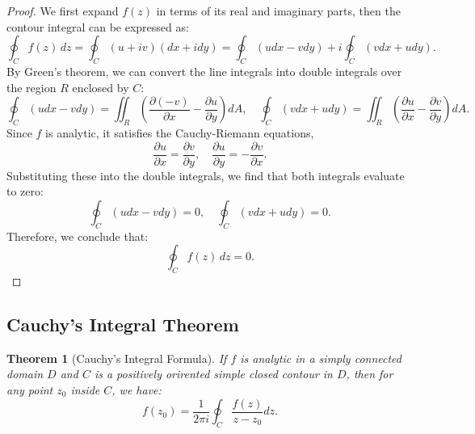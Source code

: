 \documentclass{article}
\newtheorem{theorem}{Theorem}[section]
\begin{document}
\begin{proof}
    We first expand $f(z)$ in terms of its real and imaginary parts, then the contour integral can be expressed as:
    \begin{equation}
    \oint_C f(z) \, dz = \oint_C (u + iv)(dx + i dy) = \oint_C (u dx - v dy) + i \oint_C (v dx + u dy).
    \end{equation}
    By Green's theorem, we can convert the line integrals into double integrals over the region $R$ enclosed by $C$:
    \begin{equation}
    \oint_C (u dx - v dy) = \iint_R \left(\frac{\partial (-v)}{\partial x} - \frac{\partial u}{\partial y}\right) dA, \quad \oint_C (v dx + u dy) = \iint_R \left(\frac{\partial u}{\partial x} - \frac{\partial v}{\partial y}\right) dA.
    \end{equation}
    Since $f$ is analytic, it satisfies the Cauchy-Riemann equations,
    \begin{equation}
    \frac{\partial u}{\partial x} = \frac{\partial v}{\partial y}, \quad \frac{\partial u}{\partial y} = -\frac{\partial v}{\partial x}.
    \end{equation}
    Substituting these into the double integrals, we find that both integrals evaluate to zero:
    \begin{equation}
    \oint_C (u dx - v dy) = 0, \quad \oint_C (v dx + u dy) = 0.
    \end{equation}
    Therefore, we conclude that:
    \begin{equation}
    \oint_C f(z) \, dz = 0.
    \end{equation}
\end{proof}

\subsection{Cauchy's Integral Theorem}
\begin{theorem}[Cauchy's Integral Formula]
    If $f$ is analytic in a simply connected domain $D$ and $C$ is a positively orirented simple closed contour in $D$, then for any point $z_0$ inside $C$, we have:
    \begin{equation}
        f(z_0)=\frac{1}{2\pi i} \oint_C \frac{f(z)}{z-z_0} dz.
    \end{equation}
\end{theorem}
\end{document}
